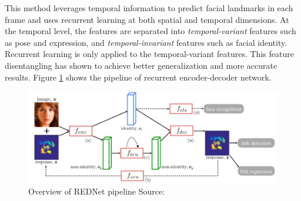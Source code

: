 \documentclass{llncs}
\begin{document}
This method leverages temporal information to predict facial landmarks in each frame and uses recurrent learning at both spatial and temporal dimensions. At the temporal level, the features are separated into \textit{temporal-variant} features such as pose and expression, and \textit{temporal-invariant} features such as facial identity. Recurrent learning is only applied to the temporal-variant features. This feature disentangling has shown to achieve better generalization and more accurate results. Figure \ref{rednet_architecture} shows the pipeline of recurrent encoder-decoder network. 
\begin{figure}
\centering
\includegraphics[scale=0.5]{Media/rednet_architecture}
\caption{Overview of REDNet pipeline Source:\cite{rednet}}
\label{rednet_architecture}
\end{figure}
\end{document}
